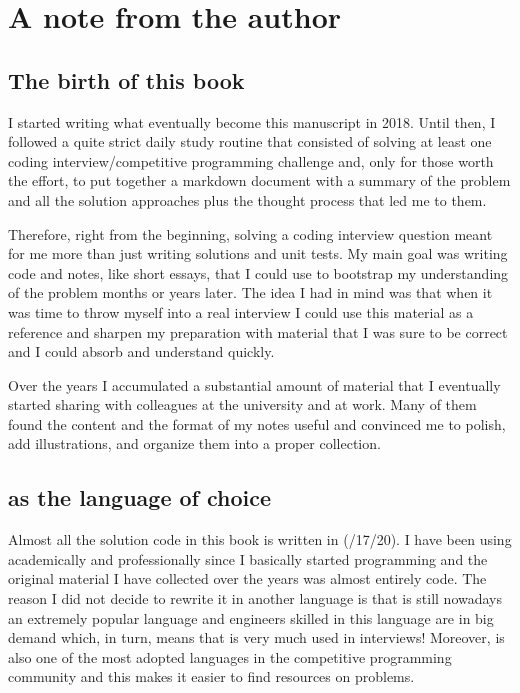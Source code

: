 \chapter*{A note from the author}

\section*{The birth of this book}
I started writing what eventually become this manuscript in 2018. 
Until then, I followed a quite strict daily study routine that consisted of solving at least one coding interview/competitive programming challenge and, only for those worth the effort, to put together a markdown document with a summary of the problem and all the solution approaches plus the thought process that led me to them.

Therefore, right from the beginning, solving a coding interview question meant for me more than just writing solutions and unit tests.
My main goal was writing code and notes, like short essays, that I could use to bootstrap my understanding of the problem months or years later.
The idea I had in mind was that when it was time to throw myself into a real interview I could use this material as a reference and sharpen my preparation with material 
that I was sure to be correct and I could absorb and understand quickly.

Over the years I accumulated a substantial amount of material that I eventually started sharing with colleagues at the university and at work. 
Many of them found the content and the format of my notes useful and convinced me to polish, add illustrations, and organize them into a proper collection.

\section*{\protect \CC as the language of choice}
Almost all the solution code in this book is written in \CC (/17/20). 
I have been using \CC academically and professionally since I basically started programming and the original material I have collected over the years was almost entirely \CC code. 
The reason I did not decide to rewrite it in another language is that \CC is still nowadays an extremely popular language and engineers skilled in this language are in big demand which, in turn, means that \CC is very much used in interviews!
Moreover, \CC is also one of the most adopted languages in the competitive programming community and this makes it easier to find resources on problems.

